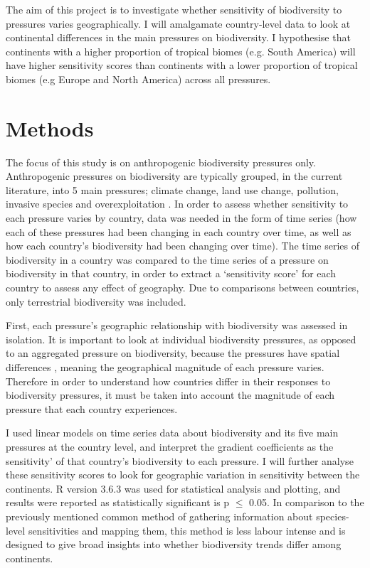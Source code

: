 \documentclass[11pt, a4paper, titlepage]{article}
\begin{document}
 	The aim of this project is to investigate whether sensitivity of biodiversity to pressures varies geographically. I will amalgamate country-level data to look at continental differences in the main pressures on biodiversity. I hypothesise that continents with a higher proportion of tropical biomes (e.g. South America) will have higher sensitivity scores than continents with a lower proportion of tropical biomes (e.g Europe and North America) across all pressures.  \newpage

    \section*{Methods}

	The focus of this study is on anthropogenic biodiversity pressures only. Anthropogenic pressures on biodiversity are typically grouped, in the current literature, into 5 main pressures; climate change, land use change, pollution, invasive species and overexploitation \citep{watson2019summary}. In order to assess whether sensitivity to each pressure varies by country, data was needed in the form of time series (how each of these pressures had been changing in each country over time, as well as how each country's biodiversity had been changing over time). The time series of biodiversity in a country was compared to the time series of a pressure on biodiversity in that country, in order to extract a `sensitivity score' for each country to assess any effect of geography. Due to comparisons between countries, only terrestrial biodiversity was included. 	 %
	

	First, each pressure's geographic relationship with biodiversity was assessed in isolation. It is important to look at individual biodiversity pressures, as opposed to an aggregated pressure on biodiversity, because the pressures have spatial differences \citep{steffen2015planetary}, meaning the geographical magnitude of each pressure varies. Therefore in order to understand how countries differ in their responses to biodiversity pressures, it must be taken into account the magnitude of each pressure that each country experiences. 
	
	I used linear models on time series data about biodiversity and its five main pressures at the country level, and interpret the gradient coefficients as the sensitivity' of that country's biodiversity to each pressure. I will further analyse these sensitivity scores to look for geographic variation in sensitivity between the continents. R version 3.6.3 was used for statistical analysis and plotting, and results were reported as statistically significant is p $\leq$ 0.05. In comparison to the previously mentioned common method of gathering information about species-level sensitivities and mapping them, this method is less labour intense and is designed to give broad insights into whether biodiversity trends differ among continents. \newline
\end{document}
